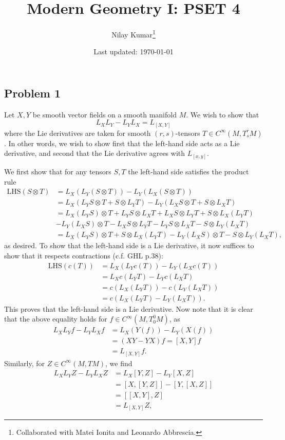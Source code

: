 \documentclass{../mathnotes}
\title{Modern Geometry I: PSET 4}
\author{Nilay Kumar\footnote{Collaborated with Matei Ionita and Leonardo Abbrescia.}}
\date{Last updated: \today}
\begin{document}
\maketitle

\subsection*{Problem 1}
Let $X,Y$ be smooth vector fields on a smooth manifold $M$. We wish to show
that
\[L_XL_Y-L_YL_X = L_{[X,Y]}\]
where the Lie derivatives are taken for smooth $(r,s)$-tensors $T\in C^\infty(M,T^r_sM)$.
In other words, we wish to show first that the left-hand side acts as a Lie derivative,
and second that the Lie derivative agrees with $L_{[x,y]}$.

We first show that for any tensors $S,T$ the left-hand side satisfies the product rule
\begin{align*}
    \text{LHS}(S\otimes T) &= L_X(L_Y(S\otimes T))-L_Y(L_X(S\otimes T))\\
    &= L_X(L_YS\otimes T+S\otimes L_YT)-L_Y(L_XS\otimes T+S\otimes L_XT)\\
    &= L_X(L_YS)\otimes T+L_YS\otimes L_XT +L_XS\otimes L_YT+S\otimes L_X(L_YT)\\
    &- L_Y(L_XS)\otimes T-L_XS\otimes L_YT-L_YS\otimes L_XT-S\otimes L_Y(L_XT)\\
    &= L_X(L_YS)\otimes T+S\otimes L_X(L_YT)- L_Y(L_XS)\otimes T-S\otimes L_Y(L_XT),
\end{align*}
as desired. To show that the left-hand side is a Lie derivative, it now suffices to
show that it respects contractions (c.f. GHL p.38):
\begin{align*}
    \text{LHS}(c(T)) &= L_X(L_Yc(T))-L_Y(L_Xc(T))\\
    &= L_Xc(L_YT)-L_Yc(L_XT)\\
    &= c(L_X(L_YT))-c(L_Y(L_XT))\\
    &= c(L_X(L_YT)-L_Y(L_XT)).
\end{align*}
This proves that the left-hand side is a Lie derivative. Now note that it is
clear that the above equality holds for $f\in C^\infty(M,T^0_0M)$, as
\begin{align*}
    L_XL_Yf-L_YL_Xf &= L_X(Y(f))-L_Y(X(f))\\
    &= (XY-YX)f=[X,Y]f\\
    &= L_{[X,Y]}f.
\end{align*}
Similarly, for $Z\in C^\infty(M,TM)$, we find
\begin{align*}
    L_XL_YZ-L_YL_XZ &= L_X[Y,Z]-L_Y[X,Z]\\
    &= [X,[Y,Z]]-[Y,[X,Z]]\\
    &= [ [X,Y], Z]\\
    &= L_{[X,Y]}Z,
\end{align*}
\end{document}
